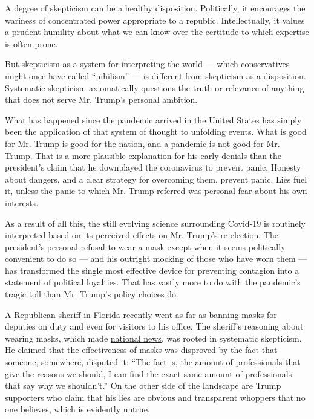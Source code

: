 A degree of skepticism can be a healthy disposition. Politically, it
encourages the wariness of concentrated power appropriate to a republic.
Intellectually, it values a prudent humility about what we can know over
the certitude to which expertise is often prone.

But skepticism as a system for interpreting the world --- which
conservatives might once have called ``nihilism'' --- is different from
skepticism as a disposition. Systematic skepticism axiomatically
questions the truth or relevance of anything that does not serve Mr.
Trump's personal ambition.

What has happened since the pandemic arrived in the United States has
simply been the application of that system of thought to unfolding
events. What is good for Mr. Trump is good for the nation, and a
pandemic is not good for Mr. Trump. That is a more plausible explanation
for his early denials than the president's claim that he downplayed the
coronavirus to prevent panic. Honesty about dangers, and a clear
strategy for overcoming them, prevent panic. Lies fuel it, unless the
panic to which Mr. Trump referred was personal fear about his own
interests.

As a result of all this, the still evolving science surrounding Covid-19
is routinely interpreted based on its perceived effects on Mr. Trump's
re-election. The president's personal refusal to wear a mask except when
it seems politically convenient to do so --- and his outright mocking of
those who have worn them --- has transformed the single most effective
device for preventing contagion into a statement of political loyalties.
That has vastly more to do with the pandemic's tragic toll than Mr.
Trump's policy choices do.

A Republican sheriff in Florida recently went as far as
\href{https://www.ocala.com/story/news/politics/county/2020/08/11/marion-county-deputies-ordered-not-to-wear-masks/113049372/}{banning
masks} for deputies on duty and even for visitors to his office. The
sheriff's reasoning about wearing masks, which made
\href{https://www.washingtonpost.com/nation/2020/08/12/masks-florida-ban-billy-woods/}{national
news}, was rooted in systematic skepticism. He claimed that the
effectiveness of masks was disproved by the fact that someone,
somewhere, disputed it: ``The fact is, the amount of professionals that
give the reasons we should, I can find the exact same amount of
professionals that say why we shouldn't.'' On the other side of the
landscape are Trump supporters who claim that his lies are obvious and
transparent whoppers that no one believes, which is evidently untrue.


